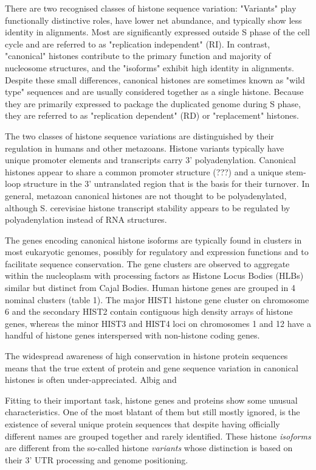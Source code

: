 \documentclass[10pt,a4paper,draft]{article}
\newcommand{\look}[2][]{\todo[caption={#2}, size=\small, #1]{\renewcommand{\baselinestretch}{0.5}\selectfont#2\par}}
\begin{document}
	There are two recognised classes of histone sequence variation: "Variants" play functionally distinctive roles, have lower net abundance, and typically show less identity in alignments. Most are significantly expressed outside S phase of the cell cycle and are referred to as "replication independent" (RI). In contrast, "canonical" histones contribute to the primary function and majority of nucleosome structures, and the "isoforms" exhibit high identity in alignments. Despite these small differences, canonical histones are sometimes known as "wild type" sequences and are usually considered together as a single histone. Because they are primarily expressed to package the duplicated genome during S phase, they are referred to as "replication dependent" (RD) or "replacement" histones.

	The two classes of histone sequence variations are distinguished by their regulation in humans and other metazoans. Histone variants typically have unique promoter elements and transcripts carry 3' polyadenylation. Canonical histones appear to share a common promoter structure (???) and a unique stem-loop structure in the 3' untranslated region that is the basis for their turnover. In general, metazoan canonical histones are not thought to be polyadenylated, although S. cerevisiae histone transcript stability appears to be regulated by polyadenylation instead of RNA structures.

	The genes encoding canonical histone isoforms are typically found in clusters in most eukaryotic genomes, possibly for regulatory and expression functions and to facilitate sequence conservation. The gene clusters are observed to aggregate within the nucleoplasm with processing factors as Histone Locus Bodies (HLBs) similar but distinct from Cajal Bodies. Human histone genes are grouped in 4 nominal clusters (table 1). The major HIST1 histone gene cluster on chromosome 6 and the secondary HIST2 contain contiguous high density arrays of histone genes, whereas the minor HIST3 and HIST4 loci on chromosomes 1 and 12 have a handful of histone genes interspersed with non-histone coding genes.

The widespread awareness of high conservation in histone protein sequences means that the true extent of protein and gene sequence variation in canonical histones is often under-appreciated. Albig and 

    Fitting to their important task, histone genes and proteins show some unusual characteristics.
    One of the most blatant of them but still mostly ignored, is the existence of several unique protein
    sequences \look{should explain better that we're not talking about SNP?} that despite having
    officially different names are grouped together and rarely identified. These histone
    \emph{isoforms} are different from the so-called histone \emph{variants} whose distinction
    is based on their 3' UTR processing and genome positioning.
\end{document}
